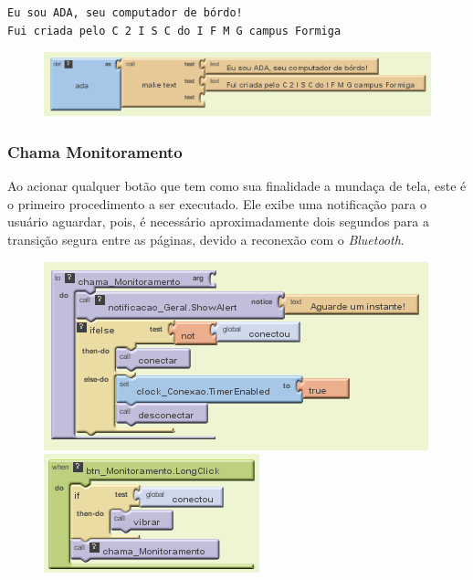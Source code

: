 \documentclass[portugues, brazil, a4paper,12pt]{article}
\begin{document}
\begin{verbatim}
Eu sou ADA, seu computador de bórdo!
Fui criada pelo C 2 I S C do I F M G campus Formiga
\end{verbatim}

\begin{figure}[H]
	\centering
	\includegraphics[scale=.9]{img/controle/textos.png}
	
\end{figure}


\subsubsection{Chama Monitoramento} 
Ao acionar qualquer botão que tem como sua finalidade a mundaça de tela, este é o primeiro procedimento a ser executado. Ele exibe uma notificação para o usuário aguardar, pois, é necessário aproximadamente dois segundos para a transição segura entre as páginas, devido a reconexão com o \textit{Bluetooth}.

\begin{figure}[H]
\centering
\begin{minipage}[c]{0.49\linewidth}
\centering
	\includegraphics[scale=.8]{img/controle/monitoramento.png}
	
\end{minipage}
\hfill
\begin{minipage}[c]{0.49\linewidth}
\centering
	\includegraphics[scale=.8]{img/controle/monitoramentoLong.png}
	
\end{minipage}
\end{figure}
\end{document}

